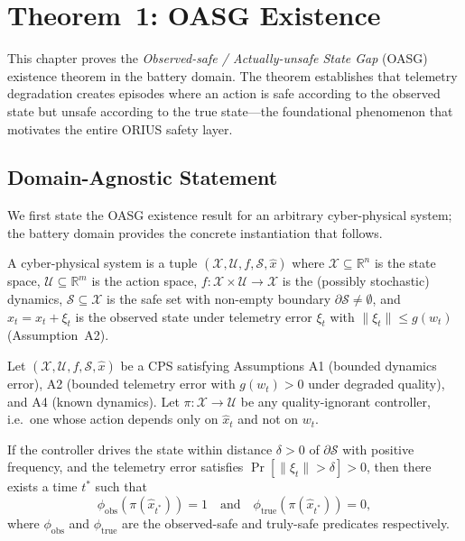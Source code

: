 
\section{Theorem~1: OASG Existence}
\label{ch:theorem-oasg}

This chapter proves the \emph{Observed-safe / Actually-unsafe State Gap}
(OASG) existence theorem in the battery domain.  The theorem
establishes that telemetry degradation creates episodes where an action
is safe according to the observed state but unsafe according to the
true state---the foundational phenomenon that motivates the entire
ORIUS safety layer.

\subsection{Domain-Agnostic Statement}

We first state the OASG existence result for an arbitrary cyber-physical
system; the battery domain provides the concrete instantiation that follows.

\begin{definition}
\label{def:abstract-cps}
A cyber-physical system is a tuple
$(\mathcal{X}, \mathcal{U}, f, \mathcal{S}, \hat{x})$ where
$\mathcal{X} \subseteq \mathbb{R}^n$ is the state space,
$\mathcal{U} \subseteq \mathbb{R}^m$ is the action space,
$f : \mathcal{X} \times \mathcal{U} \to \mathcal{X}$ is the (possibly
stochastic) dynamics, $\mathcal{S} \subseteq \mathcal{X}$ is the safe
set with non-empty boundary $\partial \mathcal{S} \neq \emptyset$, and
$\hat{x}_t = x_t + \xi_t$ is the observed state under telemetry error
$\xi_t$ with $\|\xi_t\| \le g(w_t)$ (Assumption~A2).
\end{definition}

\begin{theorem}
\label{thm:oasg-general}
Let $(\mathcal{X}, \mathcal{U}, f, \mathcal{S}, \hat{x})$ be a CPS
satisfying Assumptions A1 (bounded dynamics error), A2 (bounded telemetry
error with $g(w_t) > 0$ under degraded quality), and A4 (known dynamics).
Let $\pi : \mathcal{X} \to \mathcal{U}$ be any quality-ignorant controller,
i.e.\ one whose action depends only on $\hat{x}_t$ and not on $w_t$.

If the controller drives the state within distance
$\delta > 0$ of $\partial \mathcal{S}$ with positive frequency, and the
telemetry error satisfies $\Pr[\|\xi_t\| > \delta] > 0$, then there
exists a time $t^*$ such that
\[
  \phi_{\text{obs}}(\pi(\hat{x}_{t^*})) = 1
  \quad\text{and}\quad
  \phi_{\text{true}}(\pi(\hat{x}_{t^*})) = 0,
\]
where $\phi_{\text{obs}}$ and $\phi_{\text{true}}$ are the observed-safe
and truly-safe predicates respectively.
\end{theorem}

